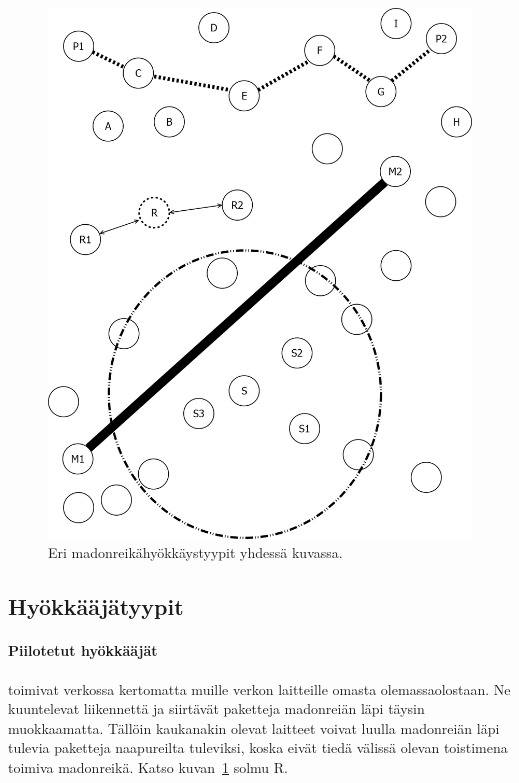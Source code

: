 \documentclass[finnish]{tktltiki2}
\theoremstyle{definition}
\theoremstyle{remark}
\begin{document}
\begin{figure}[!ht]
  \centering
  \includegraphics[width=\linewidth]{attacks}
  \caption{Eri madonreikähyökkäystyypit yhdessä kuvassa.}
  \label{fig:attacker-types}
\end{figure}

\subsection{Hyökkääjätyypit}
\paragraph{Piilotetut hyökkääjät} toimivat verkossa kertomatta muille verkon laitteille omasta olemassaolostaan. Ne kuuntelevat liikennettä ja siirtävät paketteja madonreiän läpi täysin muokkaamatta. Tällöin kaukanakin olevat laitteet voivat luulla madonreiän läpi tulevia paketteja naapureilta tuleviksi, koska eivät tiedä välissä olevan toistimena toimiva madonreikä. Katso kuvan~\ref{fig:attacker-types} solmu R.
\end{document}
